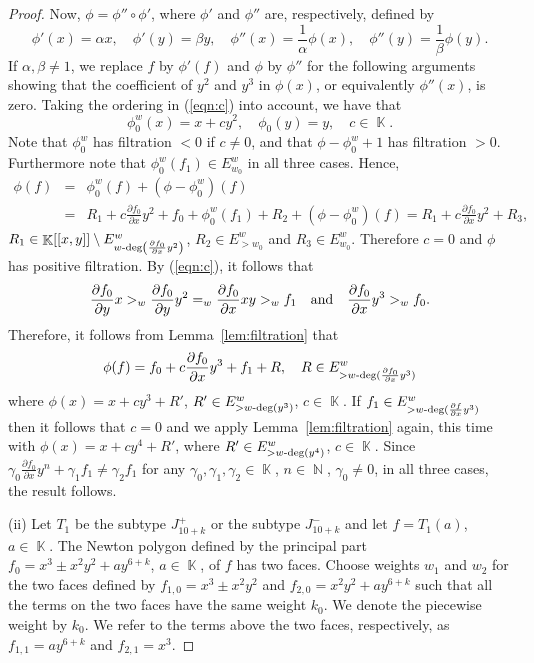 \documentclass[noend]{amsproc}
\theoremstyle{definition}
\let\originalleft\left
\let\originalright\right
\renewcommand{\left}{\mathopen{}\mathclose\bgroup\originalleft}
\renewcommand{\right}{\aftergroup\egroup\originalright}
\DeclareMathOperator{\N}{\mathbb{N}}
\DeclareMathOperator{\K}{\mathbb{K}}
\DeclareMathOperator{\dash}{\!\textnormal{-}\!}
\begin{document}
\begin{proof}
Now, $\phi=\phi''\circ\phi'$, where $\phi'$ and $\phi''$ are, respectively,
defined by
\[
\phi'(x)=\alpha x,\quad \phi'(y)=\beta y, \quad
\phi''(x)=\frac{1}{\alpha}\phi(x), \quad\phi''(y)=\frac{1}{\beta}\phi(y).
\]
If $\alpha,\beta\neq 1$, we replace $f$ by $\phi'(f)$ and $\phi$ by $\phi''$
for the following arguments showing that the coefficient of $y^2$ and $y^3$ in
$\phi(x)$, or equivalently $\phi''(x)$, is zero. Taking the ordering in
(\ref{eqn:c}) into account, we have that
\[
\phi_0^w(x)=x+cy^2, \quad\phi_0(y)=y,\quad c\in\K.
\]
Note that $\phi^w_0$ has filtration $<0$ if $c\neq 0$, and that
$\phi-\phi^w_0+1$ has filtration $>0$. Furthermore note that
$\phi_0^w(f_1)\in E_{w_0}^w$ in all three cases. Hence,
\begin{eqnarray*}
\phi(f)&=&\phi_0^w(f)+(\phi-\phi^w_0)(f)\\
&=& R_1+c\frac{\partial f_0}{\partial x}y^2+f_0+\phi^w_0(f_1)+R_2
+(\phi-\phi^w_0)(f)=R_1+c\frac{\partial f_0}{\partial x}y^2+R_3,
\end{eqnarray*}
$R_1\in\K[[x,y]]
\setminus E^w_{w\dash\deg\left(\frac{\partial f_0}{\partial x}y^2\right)}$,
$R_2\in E^w_{>w_0}$ and $R_3\in E^w_{w_0}$. Therefore $c=0$ and $\phi$ has
positive filtration.
By (\ref{eqn:c}), it follows that
\begin{equation*}
\frac{\partial f_0}{\partial y}x >_w\frac{\partial f_0}{\partial y}y^2
=_w \frac{\partial f_0}{\partial x}xy>_w f_1\quad
\textnormal{and}\quad \frac{\partial f_0}{\partial x}y^3>_w f_0.
\end{equation*}
Therefore, it follows from Lemma~\ref{lem:filtration} that
\begin{equation*}
\phi(f) = f_0+c\frac{\partial f_0}{\partial x}y^3+f_1+R,\quad
R\in E^w_{>w\dash\deg(\frac{\partial f_0}{\partial x}y^3)}
\end{equation*}
where $\phi(x) = x+ cy^3+R'$, $R'\in E^w_{>w\dash\deg(y^3)}$, $c\in\K$. If
$f_1\in E^w_{>w\dash\deg(\frac{\partial f}{\partial x}y^3)}$ then it follows
that $c=0$ and we apply Lemma~\ref{lem:filtration} again, this time with
$\phi(x)=x+cy^4+R'$, where $R'\in E^w_{>w\dash\deg(y^4)}$, $c\in\K$. Since
$\gamma_0\frac{\partial f_0}{\partial x}y^n+\gamma_1f_1\neq \gamma_2f_1$ for
any $\gamma_0,\gamma_1,\gamma_2\in\K$, $n\in\N$, $\gamma_0\neq 0$, in all three
cases, the result follows.

(ii) Let $T_1$ be the subtype $J_{10+k}^+$ or the subtype $J_{10+k}^-$ and let
$f=T_1(a)$, $a\in\K$.
The Newton polygon defined by the principal part $f_0=x^3\pm x^2y^2+ay^{6+k}$,
$a\in\K$, of $f$ has two faces. Choose weights $w_1$ and $w_2$ for the two
faces defined by $f_{1,0}=x^3\pm x^2y^2$ and $f_{2,0}=x^2y^2+ay^{6+k}$ such
that all the terms on the two faces have the same weight $k_0$. We denote the
piecewise weight by $k_0$. We refer to the terms above the two faces,
respectively, as $f_{1,1}=ay^{6+k}$ and $f_{2,1}=x^3$.


\end{proof}
\end{document}
